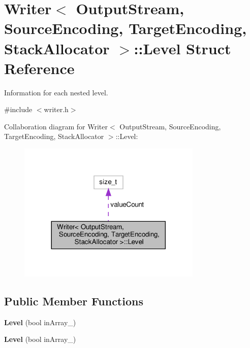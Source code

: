 \hypertarget{structWriter_1_1Level}{}\section{Writer$<$ Output\+Stream, Source\+Encoding, Target\+Encoding, Stack\+Allocator $>$\+:\+:Level Struct Reference}
\label{structWriter_1_1Level}


Information for each nested level.  




{\ttfamily \#include $<$writer.\+h$>$}



Collaboration diagram for Writer$<$ Output\+Stream, Source\+Encoding, Target\+Encoding, Stack\+Allocator $>$\+:\+:Level\+:
\nopagebreak
\begin{figure}[H]
\begin{center}
\leavevmode
\includegraphics[width=248pt]{structWriter_1_1Level__coll__graph}
\end{center}
\end{figure}
\subsection*{Public Member Functions}
\begin{DoxyCompactItemize}
\item 
\mbox{\label{structWriter_1_1Level_a4c9d2a6336d707725cd749b80059e59d}} 
{\bfseries Level} (bool in\+Array\+\_\+)
\item 
\mbox{\label{structWriter_1_1Level_a4c9d2a6336d707725cd749b80059e59d}} 
{\bfseries Level} (bool in\+Array\+\_\+)
\end{DoxyCompactItemize}
